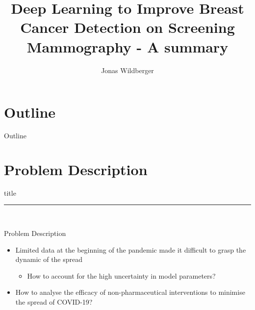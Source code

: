 \documentclass{beamer}
\title{ Deep Learning to Improve Breast Cancer Detection on Screening Mammography - A summary}
\author{Jonas Wildberger}
\institute{University of Oxford}
\date{} %
\begin{document}
{ 
\frame{\titlepage}}

\section*{Outline}\begin{frame}{Outline}\tableofcontents\end{frame}

\section{Problem Description}
    \begin{frame}[plain]
        \vfill
      \centering
      \begin{beamercolorbox}[sep=8pt,center,shadow=true,rounded=true]{title}
        \insertsectionhead\par%
        \color{oxfordblue}\noindent\rule{10cm}{1pt} \\
       
      \end{beamercolorbox}
      \vfill
  \end{frame}


\begin{frame}{Problem Description}
\begin{itemize}
	\item<1-> Limited data at the beginning of the pandemic made it difficult to grasp the dynamic of the spread
	\begin{itemize}
		\item<1-> How to account for the high uncertainty in model parameters?
	\end{itemize}
	\item<2-> How to analyse the efficacy of non-pharmaceutical interventions to minimise the spread of COVID-19?	
\end{itemize}
	
	\begin{center}
	\end{center}
	 


\end{frame}
\end{document}

